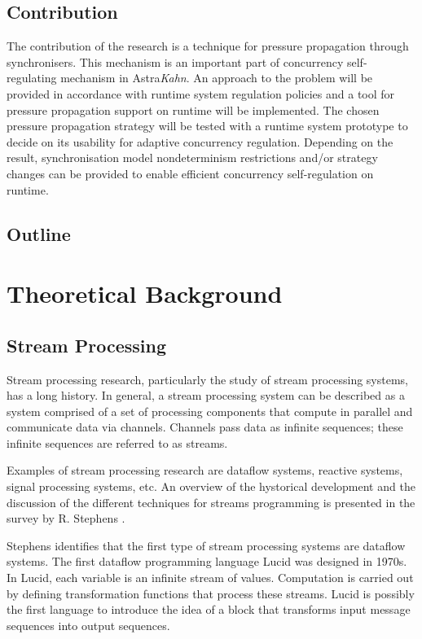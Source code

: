     \section{Contribution}
The contribution of the research is a technique for pressure propagation through synchronisers. This mechanism is an important part of concurrency self-regulating mechanism in Astra\emph{Kahn}. An approach to the problem will be provided in accordance with runtime system regulation policies and a tool for pressure propagation support on runtime will be implemented. The chosen pressure propagation strategy will be tested with a runtime system prototype to decide on its usability for adaptive concurrency regulation. Depending on the result, synchronisation model nondeterminism restrictions and/or strategy changes can be provided to enable efficient concurrency self-regulation on runtime.


    \section{Outline}

\chapter{Theoretical Background}


    \section{Stream Processing}
Stream processing research, particularly the study of stream processing systems, has a long history. In general, a stream processing system can be described as a system comprised of a set of processing components that compute in parallel and communicate data via channels. Channels pass data as infinite sequences; these infinite sequences are referred to as streams.

Examples of stream processing research are dataflow systems, reactive systems, signal processing systems, etc. An overview of the hystorical development and the discussion of the different techniques for streams programming is presented in the survey by R. Stephens \cite{stephens97}.

Stephens identifies that the first type of stream processing systems are dataflow systems. The first dataflow programming language Lucid \cite{lucid} was designed in 1970s. In Lucid, each variable is an infinite stream of values. Computation is carried out by defining transformation functions that process these streams. Lucid is possibly the first language to introduce the idea of a block that transforms input message sequences into output sequences.

